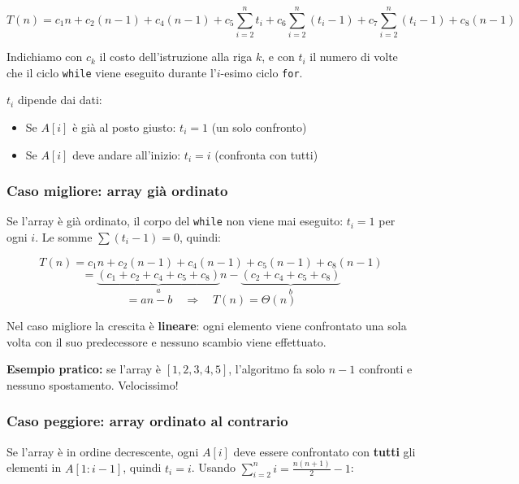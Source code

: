 \documentclass[a4paper, 11pt]{article}
\theoremstyle{definition}
\theoremstyle{remark}
\theoremstyle{remark}
\newenvironment{nota}{%
	\begin{tcolorbox}[
		colback=codebg,
		colframe=primary,
		fonttitle=\bfseries,
		title=Nota,
		left=6pt, right=6pt, top=4pt, bottom=4pt
		]
	}{%
	\end{tcolorbox}
}
\begin{document}
	
	\[
	T(n) = c_1 n + c_2(n-1) + c_4(n-1)
	+ c_5 \sum_{i=2}^{n} t_i
	+ c_6 \sum_{i=2}^{n} (t_i-1)
	+ c_7 \sum_{i=2}^{n} (t_i-1)
	+ c_8(n-1)
	\]
	
	
	Indichiamo con $c_k$ il costo dell'istruzione alla riga $k$,
	e con $t_i$ il numero di volte che il ciclo \texttt{while} viene
	eseguito durante l'$i$-esimo ciclo \texttt{for}.
	
	\begin{nota}
		$t_i$ dipende dai dati:
		\begin{itemize}
			\item Se $A[i]$ è già al posto giusto: $t_i = 1$ (un solo confronto)
			\item Se $A[i]$ deve andare all'inizio: $t_i = i$ (confronta con tutti)
		\end{itemize}
	\end{nota}
	
	\pagebreak
	
	\subsubsection*{Caso migliore: array già ordinato}
	
	Se l'array è già ordinato, il corpo del \texttt{while} non viene
	mai eseguito: $t_i = 1$ per ogni $i$.
	Le somme $\sum(t_i - 1) = 0$, quindi:
	
	\[
	T(n) = c_1 n + c_2(n-1) + c_4(n-1) + c_5(n-1) + c_8(n-1)
	\]
	\[
	= \underbrace{(c_1 + c_2 + c_4 + c_5 + c_8)}_{a} n
	- \underbrace{(c_2 + c_4 + c_5 + c_8)}_{b}
	\]
	\[
	= an - b \quad \Rightarrow \quad \boxed{T(n) = \Theta(n)}
	\]
	
	\begin{nota}
		Nel caso migliore la crescita è \textbf{lineare}: ogni elemento
		viene confrontato una sola volta con il suo predecessore e
		nessuno scambio viene effettuato.
		
		\textbf{Esempio pratico:} se l'array è $[1, 2, 3, 4, 5]$, l'algoritmo fa solo $n-1$ confronti e nessuno spostamento. Velocissimo!
	\end{nota}
	
	\subsubsection*{Caso peggiore: array ordinato al contrario}
	
	Se l'array è in ordine decrescente, ogni $A[i]$ deve essere
	confrontato con \textbf{tutti} gli elementi in $A[1:i-1]$,
	quindi $t_i = i$. Usando $\sum_{i=2}^{n} i = \frac{n(n+1)}{2} - 1$:
	
\end{document}
